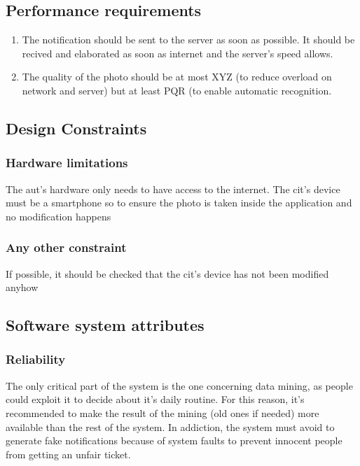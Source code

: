 \documentclass{article}
\begin{document}
	\subsection{Performance requirements}
		\begin{enumerate}
			\item The notification should be sent to the server as soon as possible. It should be recived and elaborated as soon as internet and the server's speed allows.
			\item The quality of the photo should be at most XYZ (to reduce overload on network and server) but at least PQR (to enable automatic recognition.
		\end{enumerate}
		
	\subsection{Design Constraints}
	
		\subsubsection{Hardware limitations} The aut's hardware only needs to have access to the internet. The cit's device must be a smartphone so to ensure the photo is taken inside the application and no modification happens
		
		\subsubsection{Any other constraint} If possible, it should be checked that the cit's device has not been modified anyhow
		
	\subsection{Software system attributes}
	
		\subsubsection{Reliability}
			The only critical part of the system is the one concerning data mining, as people could exploit it to decide about it's daily routine. For this reason, it's recommended to make the result of the mining (old ones if needed) more available than the rest of the system.
			In addiction, the system must avoid to generate fake notifications because of system faults to prevent innocent people from getting an unfair ticket.
			
\end{document}
